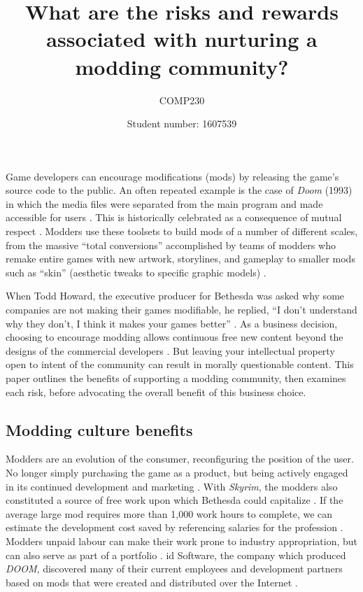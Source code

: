 \documentclass{scrartcl}
\title{What are the risks and rewards associated with nurturing a modding community?}
\subtitle{COMP230}
\author{Student number: 1607539}
\begin{document}
\maketitle

Game developers can encourage modifications (mods) by releasing the game's source code to the public. An often repeated example is the case of \textit{Doom} (1993) in which the media files were separated from the main program and made accessible for users \cite{sotamaa2010game}. This is historically celebrated as a consequence of mutual respect \cite{hong2013game}. Modders use these toolsets to build mods of a number of different scales, from the massive ``total conversions'' accomplished by teams of modders who remake entire games with new artwork, storylines, and gameplay to smaller mods such as ``skin'' (aesthetic tweaks to specific graphic models) \cite{hong2014becoming}.  

When Todd Howard, the executive producer for Bethesda was asked why some companies are not making their games modifiable, he replied, ``I don't understand why they don't, I think it makes your games better'' \cite{todd2012}. As a business decision, choosing to encourage modding allows continuous free new content beyond the designs of the commercial developers \cite{postigo2007mods}. But leaving your intellectual property open to intent of the community can result in morally questionable content. This paper outlines the benefits of supporting a modding community, then examines each risk, before advocating the overall benefit of this business choice.

\subsection*{Modding culture benefits}

Modders are an evolution of the consumer, reconfiguring the position of the user. No longer simply purchasing the game as a product, but being actively engaged in its continued development and marketing \cite{herman2006your}. With \textit{Skyrim}, the modders also constituted a source of free work upon which Bethesda could capitalize \cite{hong2013game}. If the average large mod requires more than 1,000 work hours to complete, we can estimate the development cost saved by referencing salaries for the profession \cite{postigo2007mods}. Modders unpaid labour can make their work prone to industry appropriation, but can also serve as part of a portfolio \cite{nieborg2008mod}. id Software, the company which produced \textit{DOOM}, discovered many of their current employees and development partners based on mods that were created and distributed over the Internet \cite{hong2014becoming}. 
\end{document}

